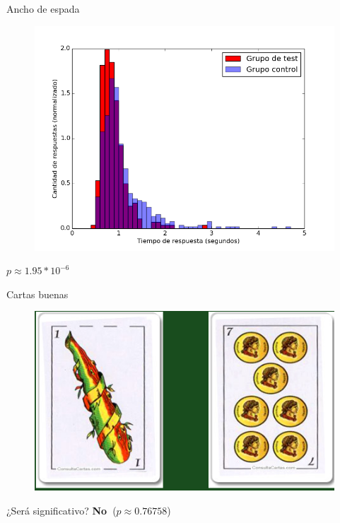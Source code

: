 \documentclass{beamer}
\begin{document}
\begin{frame}{Ancho de espada}
\begin{figure}
   \includegraphics[width=0.9\linewidth]{graficos/rondas1vs5.png}
\end{figure}
\begin{center}
$p \approx 1.95*10^{-6}$
\end{center}
\end{frame}

\begin{frame}{Cartas buenas}
\begin{figure}
   \includegraphics[width=0.8\linewidth]{examples_img/rondas_2.png}
\end{figure}
\begin{center}¿Será significativo?
\pause
\textbf{No\ }($p \approx 0.76758$)
\end{center}
\end{frame}
\end{document}
